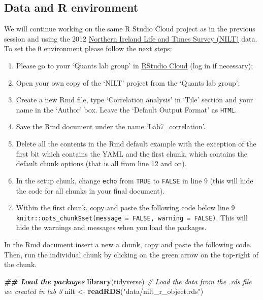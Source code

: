 \documentclass[
]{book}
\newenvironment{Shaded}{\begin{snugshade}}{\end{snugshade}}
\newcommand{\CommentTok}[1]{\textcolor[rgb]{0.56,0.35,0.01}{\textit{#1}}}
\newcommand{\DocumentationTok}[1]{\textcolor[rgb]{0.56,0.35,0.01}{\textbf{\textit{#1}}}}
\newcommand{\FunctionTok}[1]{\textcolor[rgb]{0.13,0.29,0.53}{\textbf{#1}}}
\newcommand{\NormalTok}[1]{#1}
\newcommand{\OtherTok}[1]{\textcolor[rgb]{0.56,0.35,0.01}{#1}}
\newcommand{\StringTok}[1]{\textcolor[rgb]{0.31,0.60,0.02}{#1}}
\providecommand{\tightlist}{%
  \setlength{\itemsep}{0pt}\setlength{\parskip}{0pt}}
\begin{document}
\hypertarget{data-and-r-environment}{%
\subsection{Data and R environment}\label{data-and-r-environment}}

We will continue working on the same R Studio Cloud project as in the previous session and using the 2012 \href{https://www.ark.ac.uk/nilt/}{Northern Ireland Life and Times Survey (NILT)} data. To set the \texttt{R} environment please follow the next steps:

\begin{enumerate}
\def\labelenumi{\arabic{enumi}.}
\tightlist
\item
  Please go to your `Quants lab group' in \href{https://rstudio.cloud/}{RStudio Cloud} (log in if necessary);
\item
  Open your own copy of the `NILT' project from the `Quants lab group';
\item
  Create a new Rmd file, type `Correlation analysis' in `Tile' section and your name in the `Author' box. Leave the `Default Output Format' as \texttt{HTML}.
\item
  Save the Rmd document under the name `Lab7\_correlation'.
\item
  Delete all the contents in the Rmd default example with the exception of the first bit which contains the YAML and the first chunk, which contains the default chunk options (that is all from line 12 and on).
\item
  In the setup chunk, change \texttt{echo} from \texttt{TRUE} to \texttt{FALSE} in line 9 (this will hide the code for all chunks in your final document).
\item
  Within the first chunk, copy and paste the following code below line 9 \texttt{knitr::opts\_chunk\$set(message\ =\ FALSE,\ warning\ =\ FALSE)}. This will hide the warnings and messages when you load the packages.
\end{enumerate}

In the Rmd document insert a new a chunk, copy and paste the following code. Then, run the individual chunk by clicking on the green arrow on the top-right of the chunk.

\begin{Shaded}
\begin{Highlighting}[]
\DocumentationTok{\#\# Load the packages}
\FunctionTok{library}\NormalTok{(tidyverse)}
\CommentTok{\# Load the data from the .rds file we created in lab 3}
\NormalTok{nilt }\OtherTok{\textless{}{-}} \FunctionTok{readRDS}\NormalTok{(}\StringTok{"data/nilt\_r\_object.rds"}\NormalTok{)}
\end{Highlighting}
\end{Shaded}
\end{document}
